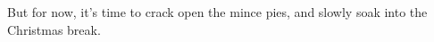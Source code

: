 \documentclass[main.tex]{subfiles}
\begin{document}
But for now, it's time to crack open the mince pies, and slowly soak into the Christmas break.



%
%
%
\end{document}
